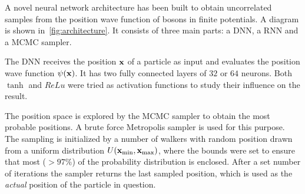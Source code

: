 \begin{figure*}[t!]
\caption{\label{fig:architecture}
  Diagrammatic overview of the neural network architecture for a system of \(N\)
  bosons. The shaded
  blue region is a single ``cell'' consisting of a RNN to update the hidden
  state, a DNN to evaluate the position wave function, and a brute force
  Metropolis sampler to sample the position space. The Metropolis sampling yields a
  probable position for the particle, \(\tilde{x}_{\text{final}}^{i}\), which is
  taken as the ``actual'' position of the particle and used in the RNN to update the hidden state. Each particle in the system
  corresponds to one cell, with the subsequent particles depending on the former
  through the hidden state. Once all of the particles have been iterated through, the
  combined wave function \(\Psi\) can be obtained from their single
  particle wave functions. Each MCMC sampling is initialized by random positions
\(\tilde{x}_{0}^{i}\)}
\end{figure*}

A novel neural network architecture has been built to obtain uncorrelated
samples from the position wave function of bosons in finite potentials. A
diagram is shown in~\cref{fig:architecture}.
It consists of three main parts: a DNN, a RNN and a MCMC sampler.


The DNN receives the position \(\vb{x}\) of a particle as input and evaluates the
position wave function \(\psi(\vb{x})\). It has two fully connected layers of
\(32\) or \(64\) neurons. Both \(\tanh\) and \(ReLu\) were tried as activation
functions to study their influence on the result. 


The position space is explored by the MCMC sampler to
obtain the most probable positions. A brute force Metropolis sampler is used for
this purpose. The sampling is initialized by a number of walkers with random
position drawn from a uniform distribution \(U(\vb{x}_{\text{min}}, \vb{x}_{\text{max}})\), where the bounds were
set to ensure that most (\(>97\%\)) of the probability distribution is enclosed. After a set number of iterations the sampler returns the last sampled
position, which is used as the \textit{actual} position of the particle in
question.



